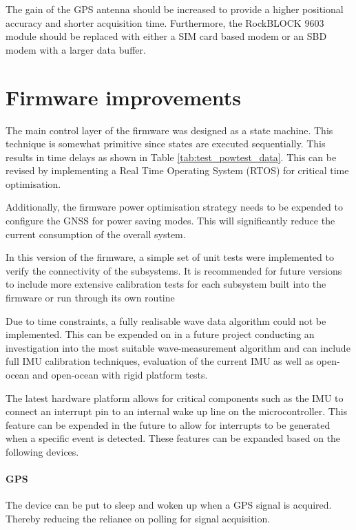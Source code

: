 The gain of the GPS antenna should be increased to provide a higher positional accuracy and shorter acquisition time. Furthermore, the RockBLOCK 9603 module should be replaced with either a SIM card based modem or an SBD modem with a larger data buffer.
\section{Firmware improvements}

The main control layer of the firmware was designed as a state machine. This technique is somewhat primitive since states are executed sequentially. This results in time delays as shown in Table \ref{tab:test_powtest_data}. This can be revised by implementing a Real Time Operating System (RTOS) for critical time optimisation. \par 

Additionally, the firmware power optimisation strategy needs to be expended to configure the GNSS for power saving modes. This will significantly reduce the current consumption of the overall system.\par 

In this version of the firmware, a simple set of unit tests were implemented to verify the connectivity of the subsystems. It is recommended for future versions to include more extensive calibration tests for each subsystem built into the firmware or run through its own routine \par 

Due to time constraints, a fully realisable wave data algorithm could not be implemented. This can be expended on in a future project conducting an investigation into the most suitable wave-measurement algorithm and can include full IMU calibration techniques, evaluation of the current IMU as well as open-ocean and open-ocean with rigid platform tests. \par 

The latest hardware platform allows for critical components such as the IMU to connect an interrupt pin to an internal wake up line on the microcontroller. This feature can be expended in the future to allow for interrupts to be generated when a specific event is detected. These features can be expanded based on the following devices.

\paragraph{GPS}

The device can be put to sleep and woken up when a GPS signal is acquired. Thereby reducing the reliance on polling for signal acquisition.

